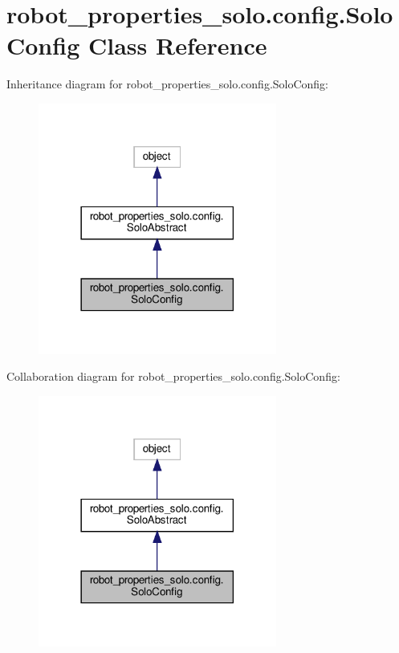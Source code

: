 \hypertarget{classrobot__properties__solo_1_1config_1_1SoloConfig}{}\section{robot\+\_\+properties\+\_\+solo.\+config.\+Solo\+Config Class Reference}
\label{classrobot__properties__solo_1_1config_1_1SoloConfig}


Inheritance diagram for robot\+\_\+properties\+\_\+solo.\+config.\+Solo\+Config\+:
\nopagebreak
\begin{figure}[H]
\begin{center}
\leavevmode
\includegraphics[width=222pt]{classrobot__properties__solo_1_1config_1_1SoloConfig__inherit__graph}
\end{center}
\end{figure}


Collaboration diagram for robot\+\_\+properties\+\_\+solo.\+config.\+Solo\+Config\+:
\nopagebreak
\begin{figure}[H]
\begin{center}
\leavevmode
\includegraphics[width=222pt]{classrobot__properties__solo_1_1config_1_1SoloConfig__coll__graph}
\end{center}
\end{figure}
